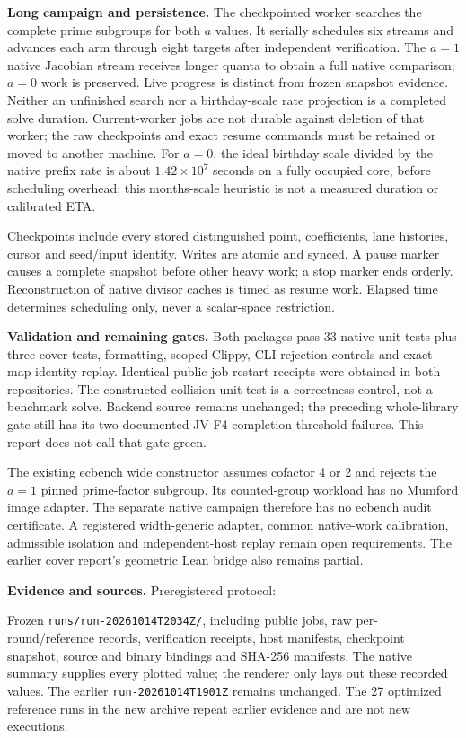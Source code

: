 \documentclass[10pt]{article}
\begin{document}
\textbf{Long campaign and persistence.} The checkpointed worker searches the
complete prime subgroups for both $a$ values. It serially schedules six streams
and advances each arm through eight targets after independent verification.
The $a=1$ native Jacobian stream receives longer quanta to obtain a full native
comparison; $a=0$ work is preserved. Live progress is distinct from frozen
snapshot evidence. Neither an unfinished search nor a birthday-scale rate
projection is a completed solve duration. Current-worker jobs are not durable
against deletion of that worker; the raw checkpoints and exact resume commands
must be retained or moved to another machine.
For $a=0$, the ideal birthday scale divided by the native prefix rate is about
$1.42\times10^7$ seconds on a fully occupied core, before scheduling overhead;
this months-scale heuristic is not a measured duration or calibrated ETA.

Checkpoints include every stored distinguished point, coefficients, lane
histories, cursor and seed/input identity. Writes are atomic and synced. A
pause marker causes a complete snapshot before other heavy work; a stop marker
ends orderly. Reconstruction of native divisor caches is timed as resume work.
Elapsed time determines scheduling only, never a scalar-space restriction.

\newpage
\textbf{Validation and remaining gates.} Both packages pass 33 native unit
tests plus three cover tests, formatting, scoped Clippy, CLI rejection controls
and exact map-identity replay. Identical public-job restart receipts were
obtained in both repositories. The constructed collision unit test is a
correctness control, not a benchmark solve. Backend source remains unchanged;
the preceding whole-library gate still has its two documented JV F4 completion
threshold failures. This report does not call that gate green.

The existing ecbench wide constructor assumes cofactor 4 or 2 and rejects the
$a=1$ pinned prime-factor subgroup. Its counted-group workload has no Mumford
image adapter. The separate native campaign therefore has no ecbench audit
certificate. A registered width-generic adapter, common native-work calibration,
admissible isolation and independent-host replay remain open requirements.
The earlier cover report's geometric Lean bridge also remains partial.

\textbf{Evidence and sources.} Preregistered protocol:
\par{\small{}}\par
Frozen \texttt{runs/run-20261014T2034Z/}, including public jobs, raw per-round/reference
records, verification receipts, host manifests, checkpoint snapshot, source and
binary bindings and SHA-256 manifests. The native summary supplies every plotted
value; the renderer only lays out these recorded values. The earlier
\texttt{run-20261014T1901Z} remains unchanged. The 27 optimized reference
runs in the new archive repeat earlier evidence and are not new executions.
\end{document}
